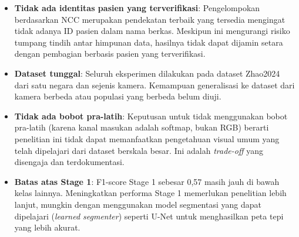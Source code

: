 \begin{itemize}
    \item \textbf{Tidak ada identitas pasien yang terverifikasi}: Pengelompokan berdasarkan NCC
    merupakan pendekatan terbaik yang tersedia mengingat tidak adanya ID pasien dalam nama
    berkas. Meskipun ini mengurangi risiko tumpang tindih antar himpunan data, hasilnya tidak
    dapat dijamin setara dengan pembagian berbasis pasien yang terverifikasi.
    \item \textbf{Dataset tunggal}: Seluruh eksperimen dilakukan pada dataset Zhao2024 dari
    satu negara dan sejenis kamera. Kemampuan generalisasi ke dataset dari kamera
    berbeda atau populasi yang berbeda belum diuji.
    \item \textbf{Tidak ada bobot pra-latih}: Keputusan untuk tidak menggunakan bobot pra-latih
    (karena kanal masukan adalah softmap, bukan RGB) berarti penelitian ini tidak dapat
    memanfaatkan pengetahuan visual umum yang telah dipelajari dari dataset berskala besar.
    Ini adalah \textit{trade-off} yang disengaja dan terdokumentasi.
    \item \textbf{Batas atas Stage 1}: F1-score Stage 1 sebesar 0,57 masih jauh di bawah
    kelas lainnya. Meningkatkan performa Stage 1 memerlukan penelitian lebih lanjut, mungkin
    dengan menggunakan model segmentasi yang dapat dipelajari (\textit{learned segmenter})
    seperti U-Net \citep{Ronneberger2015} untuk menghasilkan peta tepi yang lebih akurat.
\end{itemize}
